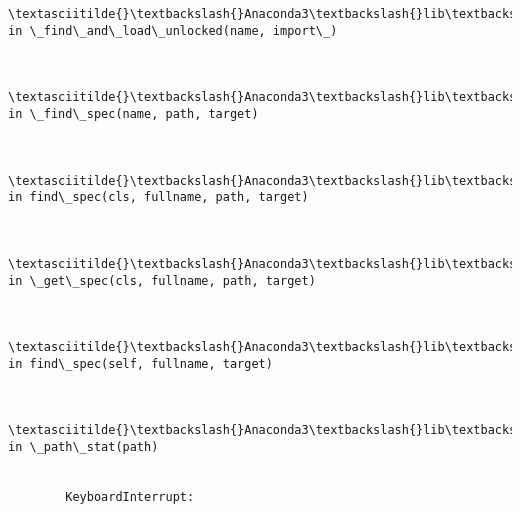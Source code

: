 \documentclass[11pt]{article}
\begin{document}
\begin{Verbatim}[commandchars=\\\{\}]
        \textasciitilde{}\textbackslash{}Anaconda3\textbackslash{}lib\textbackslash{}importlib\textbackslash{}\_bootstrap.py in \_find\_and\_load\_unlocked(name, import\_)
    

        \textasciitilde{}\textbackslash{}Anaconda3\textbackslash{}lib\textbackslash{}importlib\textbackslash{}\_bootstrap.py in \_find\_spec(name, path, target)
    

        \textasciitilde{}\textbackslash{}Anaconda3\textbackslash{}lib\textbackslash{}importlib\textbackslash{}\_bootstrap\_external.py in find\_spec(cls, fullname, path, target)
    

        \textasciitilde{}\textbackslash{}Anaconda3\textbackslash{}lib\textbackslash{}importlib\textbackslash{}\_bootstrap\_external.py in \_get\_spec(cls, fullname, path, target)
    

        \textasciitilde{}\textbackslash{}Anaconda3\textbackslash{}lib\textbackslash{}importlib\textbackslash{}\_bootstrap\_external.py in find\_spec(self, fullname, target)
    

        \textasciitilde{}\textbackslash{}Anaconda3\textbackslash{}lib\textbackslash{}importlib\textbackslash{}\_bootstrap\_external.py in \_path\_stat(path)
    

        KeyboardInterrupt: 

    \end{Verbatim}


    
    
    
    
\end{document}
